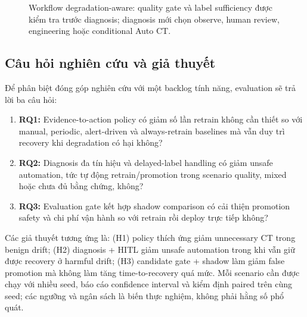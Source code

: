 \documentclass[11pt,a4paper]{article}
\begin{document}
\begin{figure}[ht]
{%
}
\caption{Workflow degradation-aware: quality gate và label sufficiency được kiểm tra trước diagnosis; diagnosis mới chọn observe, human review, engineering hoặc conditional Auto CT.}
\label{fig:degradation-workflow}
\end{figure}

\subsection{Câu hỏi nghiên cứu và giả thuyết}
Để phân biệt đóng góp nghiên cứu với một backlog tính năng, evaluation sẽ trả lời ba câu hỏi:

\begin{enumerate}
  \item \textbf{RQ1:} Evidence-to-action policy có giảm số lần retrain không cần thiết so với manual, periodic, alert-driven và always-retrain baselines mà vẫn duy trì recovery khi degradation có hại không?
  \item \textbf{RQ2:} Diagnosis đa tín hiệu và delayed-label handling có giảm unsafe automation, tức tự động retrain/promotion trong scenario quality, mixed hoặc chưa đủ bằng chứng, không?
  \item \textbf{RQ3:} Evaluation gate kết hợp shadow comparison có cải thiện promotion safety và chi phí vận hành so với retrain rồi deploy trực tiếp không?
\end{enumerate}

Các giả thuyết tương ứng là: (H1) policy thích ứng giảm unnecessary CT trong benign drift; (H2) diagnosis + HITL giảm unsafe automation trong khi vẫn giữ được recovery ở harmful drift; (H3) candidate gate + shadow làm giảm false promotion mà không làm tăng time-to-recovery quá mức. Mỗi scenario cần được chạy với nhiều seed, báo cáo confidence interval và kiểm định paired trên cùng seed; các ngưỡng và ngân sách là biến thực nghiệm, không phải hằng số phổ quát.
\end{document}
